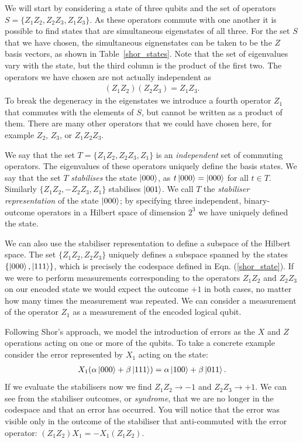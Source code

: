 We will start by considering a state of three qubits and the set of operators $S = \{Z_1Z_2, Z_2Z_3, Z_1Z_3\}$. As these operators commute with one another it is possible to find states that are simultaneous eigenstates of all three. For the set $S$ that we have chosen, the simultaneous eignenstates can be taken to be the $Z$ basis vectors, as shown in Table~\ref{shor_states}. Note that the set of eigenvalues vary with the state, but the third column is the product of the first two. The operators we have chosen are not actually independent as
\begin{align}
  (Z_1Z_2)(Z_2Z_3) = Z_1Z_3.
\end{align}
To break the degeneracy in the eigenstates we introduce a fourth operator $Z_1$ that commutes with the elements of $S$, but cannot be written as a product of them. There are many other operators that we could have chosen here, for example $Z_2$, $Z_3$, or $Z_1Z_2Z_3$.

We say that the set $T = \{Z_1Z_2, Z_2Z_3, Z_1\}$ is an \textit{independent} set of commuting operators. The eigenvalues of these operators uniquely define the basis states. We say that the set $T$ \textit{stabilises} the state $\left\vert000\right\rangle$, as $t\left\vert000\right\rangle = \left\vert000\right\rangle$ for all $t\in T$. Similarly $\{Z_1Z_2, -Z_2Z_3, Z_1\}$ stabilises $\left\vert001\right\rangle$. We call $T$ the \textit{stabiliser representation} of the state $\left\vert000\right\rangle$; by specifying three independent, binary-outcome operators in a Hilbert space of dimension $2^3$ we have uniquely defined the state.

We can also use the stabiliser representation to define a subspace of the Hilbert space. The set $\{Z_1Z_2, Z_2Z_3\}$ uniquely defines a subspace spanned by the states $\{\left\vert000\right\rangle, \left\vert111\right\rangle\}$, which is precisely the codespace defined in Eqn. (\ref{shor_state}). If we were to perform measurements corresponding to the operators $Z_1Z_2$ and $Z_2Z_3$ on our encoded state we would expect the outcome $+1$ in both cases, no matter how many times the measurement was repeated. We can consider a measurement of the operator $Z_1$ as a measurement of the encoded logical qubit.

Following Shor's approach, we model the introduction of errors as the $X$ and $Z$ operations acting on one or more of the qubits. To take a concrete example consider the error represented by $X_1$ acting on the state:
\begin{align}
  X_1 (\alpha\left\vert000\right\rangle + \beta\left\vert111\right\rangle) = \alpha\left\vert100\right\rangle + \beta\left\vert011\right\rangle.
\end{align}
If we evaluate the stabilisers now we find $Z_1Z_2 \rightarrow -1$ and $Z_2 Z_3 \rightarrow +1$. We can see from the stabiliser outcomes, or \textit{syndrome}, that we are no longer in the codespace and that an error has occurred. You will notice that the error was visible only in the outcome of the stabiliser that anti-commuted with the error operator: $(Z_1Z_2)X_1 = -X_1(Z_1Z_2)$.

